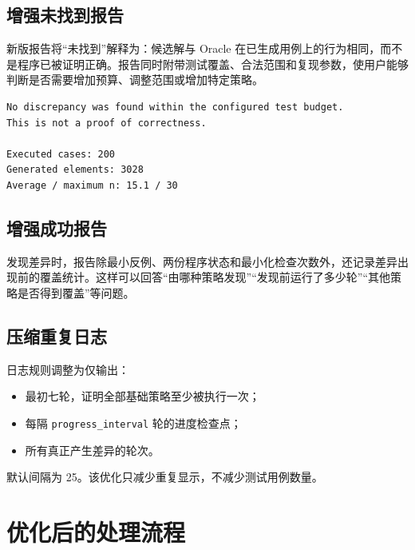 \documentclass[10pt,a4paper]{ctexart}
\newcommand{\code}[1]{\texttt{#1}}
\begin{document}
\subsection{增强未找到报告}

新版报告将“未找到”解释为：候选解与 Oracle 在已生成用例上的行为相同，而不是程序已被证明正确。报告同时附带测试覆盖、合法范围和复现参数，使用户能够判断是否需要增加预算、调整范围或增加特定策略。

\begin{lstlisting}
No discrepancy was found within the configured test budget.
This is not a proof of correctness.

Executed cases: 200
Generated elements: 3028
Average / maximum n: 15.1 / 30
\end{lstlisting}

\subsection{增强成功报告}

发现差异时，报告除最小反例、两份程序状态和最小化检查次数外，还记录差异出现前的覆盖统计。这样可以回答“由哪种策略发现”“发现前运行了多少轮”“其他策略是否得到覆盖”等问题。

\subsection{压缩重复日志}

日志规则调整为仅输出：
\begin{itemize}
  \item 最初七轮，证明全部基础策略至少被执行一次；
  \item 每隔 \code{progress\_interval} 轮的进度检查点；
  \item 所有真正产生差异的轮次。
\end{itemize}

默认间隔为 25。该优化只减少重复显示，不减少测试用例数量。

\section{优化后的处理流程}
\end{document}
